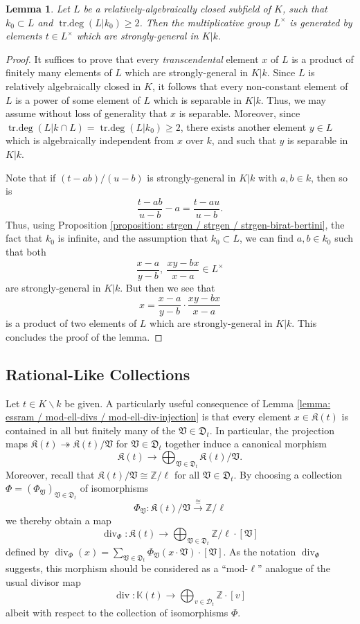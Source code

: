 \documentclass[11pt]{amsart}
\newtheorem{lemma}[proposition]{Lemma}
\theoremstyle{definition}
\theoremstyle{remark}
\numberwithin{equation}{section}
\DeclareMathOperator{\divv}{div}
\DeclareMathOperator{\trdeg}{tr.deg}
\newcommand{\Z}{\mathbb{Z}}
\newcommand{\Kbb}{\mathbb{K}}
\newcommand{\Dcal}{\mathscr{D}}
\newcommand{\Kfrak}{\mathfrak{K}}
\newcommand{\Dfrak}{\mathfrak{D}}
\newcommand{\Vfrak}{\mathfrak{V}}
\begin{document}
\begin{lemma}
\label{lemma: strgen / strgen / strgen-generate}
  Let $L$ be a relatively-algebraically closed subfield of $K$, such that $k_0 \subset L$ and $\trdeg(L|k_0) \geq 2$.
  Then the multiplicative group $L^\times$ is generated by elements $t \in L^\times$ which are strongly-general in $K|k$.
\end{lemma}
\begin{proof}
  It suffices to prove that every \emph{transcendental} element $x$ of $L$ is a product of finitely many elements of $L$ which are strongly-general in $K|k$.
  Since $L$ is relatively algebraically closed in $K$, it follows that every non-constant element of $L$ is a power of some element of $L$ which is separable in $K|k$.
  Thus, we may assume without loss of generality that $x$ is separable.
  Moreover, since $\trdeg(L|k \cap L) = \trdeg(L|k_0) \geq 2$, there exists another element $y \in L$ which is algebraically independent from $x$ over $k$, and such that $y$ is separable in $K|k$.

  Note that if $(t-ab)/(u-b)$ is strongly-general in $K|k$ with $a,b \in k$, then so is
  \[ \frac{t-ab}{u-b} - a = \frac{t-au}{u-b}. \]
  Thus, using Proposition \ref{proposition: strgen / strgen / strgen-birat-bertini}, the fact that $k_0$ is infinite, and the assumption that $k_0 \subset L$, we can find $a,b \in k_0$ such that both
  \[ \frac{x-a}{y-b}, \ \frac{xy-bx}{x-a} \in L^\times \]
  are strongly-general in $K|k$.
  But then we see that
  \[ x = \frac{x-a}{y-b} \cdot \frac{xy-bx}{x-a} \]
  is a product of two elements of $L$ which are strongly-general in $K|k$.
  This concludes the proof of the lemma.
\end{proof}

\subsection{Rational-Like Collections}
\label{subsection: strgen / rational-like}

Let $t \in K \smallsetminus k$ be given.
A particularly useful consequence of Lemma \ref{lemma: essram / mod-ell-divs / mod-ell-div-injection} is that every element $x \in \Kfrak(t)$ is contained in all but finitely many of the $\Vfrak \in \Dfrak_t$.
In particular, the projection maps $\Kfrak(t) \twoheadrightarrow \Kfrak(t)/\Vfrak$ for $\Vfrak \in \Dfrak_t$ together induce a canonical morphism
\[ \Kfrak(t) \rightarrow \bigoplus_{\Vfrak \in \Dfrak_t} \Kfrak(t)/\Vfrak. \]
Moreover, recall that $\Kfrak(t)/\Vfrak \cong \Z/\ell$ for all $\Vfrak \in \Dfrak_t$.
By choosing a collection $\Phi = (\Phi_\Vfrak)_{\Vfrak \in \Dfrak_t}$ of isomorphisms
\[ \Phi_\Vfrak : \Kfrak(t)/\Vfrak \xrightarrow{\cong} \Z/\ell \]
we thereby obtain a map
\[ \divv_\Phi : \Kfrak(t) \rightarrow \bigoplus_{\Vfrak \in \Dfrak_t} \Z/\ell \cdot [\Vfrak] \]
defined by $\divv_\Phi(x) = \sum_{\Vfrak \in \Dfrak_t} \Phi_\Vfrak(x \cdot \Vfrak) \cdot [\Vfrak]$.
As the notation $\divv_\Phi$ suggests, this morphism should be considered as a ``mod-$\ell$'' analogue of the usual divisor map
\[ \divv : \Kbb(t) \rightarrow \bigoplus_{v \in \Dcal_t} \Z \cdot [v] \]
albeit with respect to the collection of isomorphisms $\Phi$.
\end{document}
